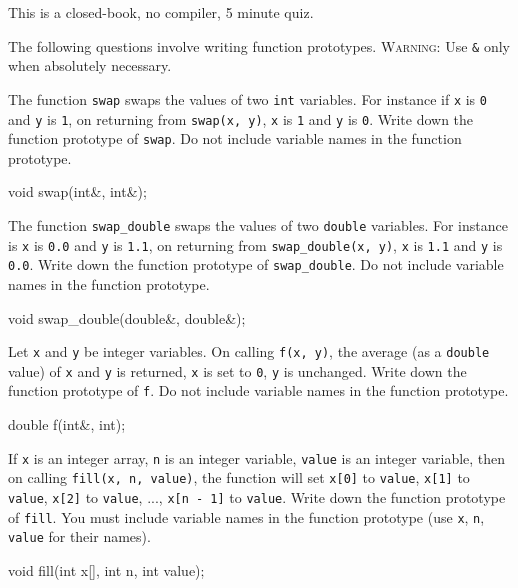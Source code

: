 

This is a closed-book, no compiler, 5 minute quiz.

The following questions involve writing function prototypes.
\textsc{Warning:} Use \verb!&! only when absolutely necessary.

\nextq
The function \verb!swap! swaps the values of two \verb!int! variables.
For instance if \verb!x! is \verb!0! and \verb!y! is \verb!1!,
on returning from \verb!swap(x, y)!, \verb!x! is \verb!1! and
\verb!y! is \verb!0!.
Write down the function prototype of \verb!swap!.
Do not include variable names in the function prototype.
\\
\ANSWER
\begin{answercode}
void swap(int&, int&);
\end{answercode}

\nextq
The function \verb!swap_double! swaps the values of two
\verb!double! variables.
For instance is \verb!x! is \verb!0.0! and \verb!y! is \verb!1.1!,
on returning from \verb!swap_double(x, y)!, \verb!x! is \verb!1.1! and
\verb!y! is \verb!0.0!.
Write down the function prototype of \verb!swap_double!.
Do not include variable names in the function prototype.
\\
\ANSWER
\begin{answercode}
void swap_double(double&, double&);
\end{answercode}

\nextq
Let \verb!x! and \verb!y! be integer variables.
On calling \verb!f(x, y)!, the average (as a \verb!double! value)
of \verb!x! and \verb!y! is returned, \verb!x! is set to \verb!0!,
\verb!y! is unchanged.
Write down the function prototype of \verb!f!.
Do not include variable names in the function prototype.
\\
\ANSWER
\begin{answercode}
double f(int&, int);
\end{answercode}

\nextq
If \verb!x! is an integer array, \verb!n! is an integer variable,
\verb!value! is an integer variable,
then on calling \verb!fill(x, n, value)!,
the function will set
\verb!x[0]! to \verb!value!,
\verb!x[1]! to \verb!value!,
\verb!x[2]! to \verb!value!, ...,
\verb!x[n - 1]! to \verb!value!.
Write down the function prototype of \verb!fill!.
You must include variable names in the function prototype
(use \verb!x!, \verb!n!, \verb!value! for their names).
\\
\ANSWER
\begin{answercode}
void fill(int x[], int n, int value);
\end{answercode}

